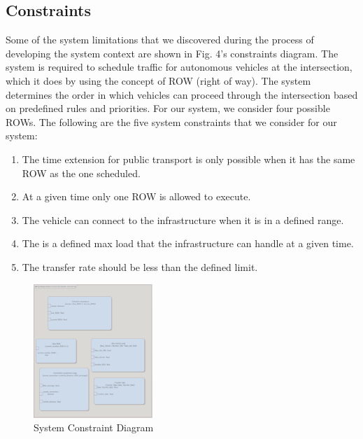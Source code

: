 \subsection{Constraints}
\label{subsec:constraints}
Some of the system limitations that we discovered during the process of developing the system context are shown in Fig. 4's constraints diagram. The system is required to schedule traffic for autonomous vehicles at the intersection, which it does by using the concept of ROW (right of way). The system determines the order in which vehicles can proceed through the intersection based on predefined rules and priorities. For our system, we consider four possible ROWs. The following are the five system constraints that we consider for our system:
\begin{enumerate}
    \item The time extension for public transport is only possible when it has the same ROW as the one scheduled.
    \item At a given time only one ROW is allowed to execute.
    \item The vehicle can connect to the infrastructure when it is in a defined range. 
    \item The is a defined max load that the infrastructure can handle at a given time.
    \item The transfer rate should be less than the defined limit. 
    
\end{enumerate}
\begin{figure}[ht]
    \centering
    \includegraphics[width=0.4\textwidth]{images/system_constraint.png}
    \caption{System Constraint Diagram}
    \label{img:system_constraints}
\end{figure}